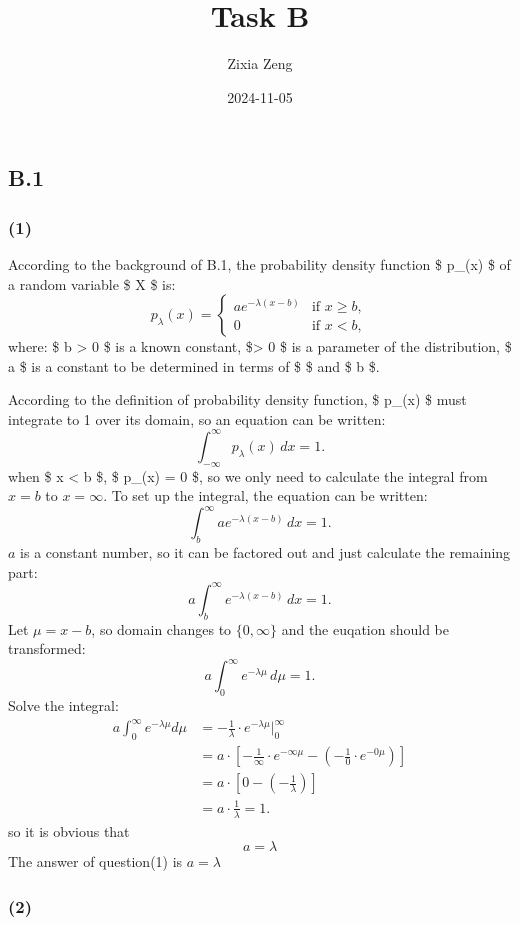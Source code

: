 \documentclass[
]{article}
\title{Task B}
\author{Zixia Zeng}
\date{2024-11-05}
\begin{document}
\maketitle

\subsection{B.1}\label{b.1}

\subsubsection{(1)}\label{section}

According to the background of B.1, the probability density function \$
p\_\lambda(x) \$ of a random variable \$ X \$ is: \[
p_\lambda(x) = \begin{cases} 
ae^{-\lambda(x - b)} & \text{if } x \geq b, \\
0 & \text{if } x < b,
\end{cases}
\] where: \$ b \textgreater{} 0 \$ is a known constant,
\$\lambda \textgreater{} 0 \$ is a parameter of the distribution, \$ a
\$ is a constant to be determined in terms of \$ \lambda \$ and \$ b \$.

According to the definition of probability density function, \$
p\_\lambda(x) \$ must integrate to 1 over its domain, so an equation can
be written: \[
\int_{-\infty}^{\infty} p_\lambda(x) \, dx = 1.
\] when \$ x \textless{} b \$, \$ p\_\lambda(x) = 0 \$, so we only need
to calculate the integral from \(x = b\) to \(x = \infty\). To set up
the integral, the equation can be written: \[
\int_{b}^{\infty} ae^{-\lambda(x - b)} \, dx = 1.
\] \(a\) is a constant number, so it can be factored out and just
calculate the remaining part: \[
a\int_{b}^{\infty} e^{-\lambda(x - b)} \, dx = 1.
\] Let \(\mu = x-b\), so domain changes to \(\{0,\infty\}\) and the
euqation should be transformed: \[
a\int_{0}^{\infty} e^{-\lambda\mu} \, d\mu = 1.
\] Solve the integral: \[
\begin{align*}
a\int_{0}^{\infty} e^{-\lambda\mu} d\mu 
&= -\frac{1}{\lambda} \cdot e^{-\lambda\mu}|_{0}^{\infty} \\
&= a \cdot [-\frac{1}{\infty} \cdot e^{-\infty \mu} -(-\frac{1}{0} \cdot e^{-0 \mu} )]\\
&= a \cdot [0-(-\frac{1}{\lambda})]\\
&= a \cdot \frac{1}{\lambda} = 1.
\end{align*}
\] so it is obvious that \[a = \lambda\] The answer of question(1) is
\(a = \lambda\)

\subsubsection{(2)}\label{section-1}
\end{document}
